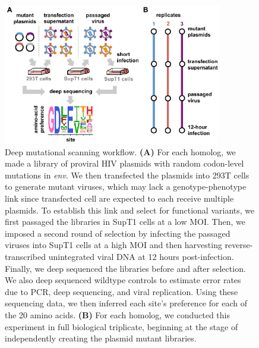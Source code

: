 \documentclass[9pt,lineno]{elife}
\begin{document}
\begin{figure}
\centerline{\includegraphics[width=0.85\textwidth]{figures/dms_schematic/dms_schematic.pdf}}
\caption{\label{fig:dms_schematic}
Deep mutational scanning workflow.
{\bf (A)} For each homolog, we made a library of proviral HIV plasmids with random codon-level mutations in \textit{env}.
We then transfected the plasmids into 293T cells to generate mutant viruses, which may lack a genotype-phenotype link since transfected cell are expected to each receive multiple plasmids.
To establish this link and select for functional variants, we first passaged the libraries in SupT1 cells at a low MOI.
Then, we imposed a second round of selection by infecting the passaged viruses into SupT1 cells at a high MOI and then harvesting reverse-transcribed unintegrated viral DNA at 12 hours post-infection.
Finally, we deep sequenced the libraries before and after selection.
We also deep sequenced wildtype controls to estimate error rates due to PCR, deep sequencing, and viral replication.
Using these sequencing data, we then inferred each site's preference for each of the 20 amino acids.
{\bf (B)} For each homolog, we conducted this experiment in full biological triplicate, beginning at the stage of independently creating the plasmid mutant libraries.
}
\end{figure}
\end{document}
